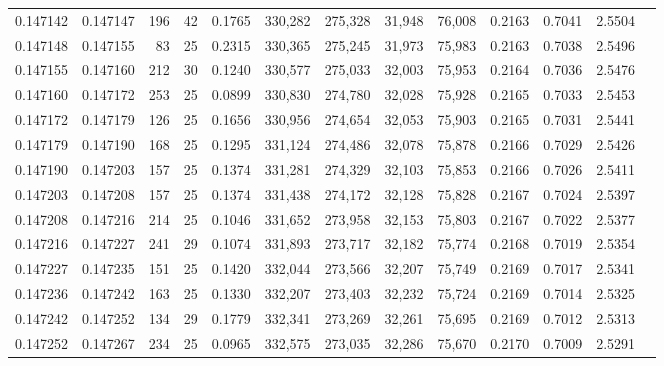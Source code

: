 \begin{tabular}{rrrrrrrrrrrrr}
0.147142 & 0.147147 & 196 &  42 &                                     0.1765 & 330,282 & 275,328 &  31,948 &  76,008 & 0.2163 & 0.7041 & 2.5504 \\
0.147148 & 0.147155 &  83 &  25 &                                     0.2315 & 330,365 & 275,245 &  31,973 &  75,983 & 0.2163 & 0.7038 & 2.5496 \\
0.147155 & 0.147160 & 212 &  30 &                                     0.1240 & 330,577 & 275,033 &  32,003 &  75,953 & 0.2164 & 0.7036 & 2.5476 \\
0.147160 & 0.147172 & 253 &  25 &                                     0.0899 & 330,830 & 274,780 &  32,028 &  75,928 & 0.2165 & 0.7033 & 2.5453 \\
0.147172 & 0.147179 & 126 &  25 &                                     0.1656 & 330,956 & 274,654 &  32,053 &  75,903 & 0.2165 & 0.7031 & 2.5441 \\
0.147179 & 0.147190 & 168 &  25 &                                     0.1295 & 331,124 & 274,486 &  32,078 &  75,878 & 0.2166 & 0.7029 & 2.5426 \\
0.147190 & 0.147203 & 157 &  25 &                                     0.1374 & 331,281 & 274,329 &  32,103 &  75,853 & 0.2166 & 0.7026 & 2.5411 \\
0.147203 & 0.147208 & 157 &  25 &                                     0.1374 & 331,438 & 274,172 &  32,128 &  75,828 & 0.2167 & 0.7024 & 2.5397 \\
0.147208 & 0.147216 & 214 &  25 &                                     0.1046 & 331,652 & 273,958 &  32,153 &  75,803 & 0.2167 & 0.7022 & 2.5377 \\
0.147216 & 0.147227 & 241 &  29 &                                     0.1074 & 331,893 & 273,717 &  32,182 &  75,774 & 0.2168 & 0.7019 & 2.5354 \\
0.147227 & 0.147235 & 151 &  25 &                                     0.1420 & 332,044 & 273,566 &  32,207 &  75,749 & 0.2169 & 0.7017 & 2.5341 \\
0.147236 & 0.147242 & 163 &  25 &                                     0.1330 & 332,207 & 273,403 &  32,232 &  75,724 & 0.2169 & 0.7014 & 2.5325 \\
0.147242 & 0.147252 & 134 &  29 &                                     0.1779 & 332,341 & 273,269 &  32,261 &  75,695 & 0.2169 & 0.7012 & 2.5313 \\
0.147252 & 0.147267 & 234 &  25 &                                     0.0965 & 332,575 & 273,035 &  32,286 &  75,670 & 0.2170 & 0.7009 & 2.5291 \\

\end{tabular}
